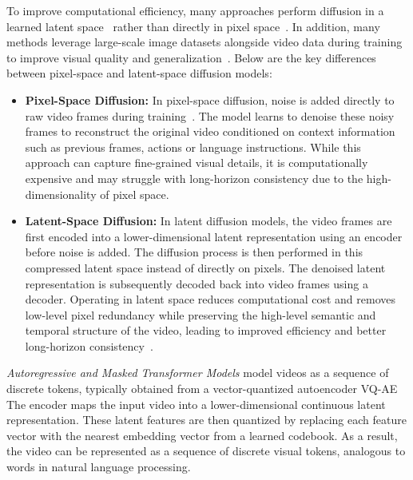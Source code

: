 To improve computational efficiency, many approaches perform diffusion in a learned latent space~\cite{videoworldsimulators2024, Blattmann2023StableVD, BarTal2024LumiereAS} rather than directly in pixel space~\cite{Singer2022MakeAVideoTG, Ho2022VideoDM, Ho2022ImagenVH}. In addition, many methods leverage large-scale image datasets alongside video data during training to improve visual quality and generalization~\cite{Ho2022VideoDM, Singer2022MakeAVideoTG, BarTal2024LumiereAS, Blattmann2023AlignYL, Ge2023PreserveYO, Dai2023EmuEI}. 
Below are the key differences between pixel-space and latent-space diffusion models:
\begin{itemize}
    \item \textbf{Pixel-Space Diffusion:} In pixel-space diffusion, noise is added directly to raw video frames during training~\cite{Ho2020DenoisingDP}. The model learns to denoise these noisy frames to reconstruct the original video conditioned on context information such as previous frames, actions or language instructions. While this approach can capture fine-grained visual details, it is computationally expensive and may struggle with long-horizon consistency due to the high-dimensionality of pixel space.

    \item \textbf{Latent-Space Diffusion:} In latent diffusion models, the video frames are first encoded into a lower-dimensional latent representation using an encoder before noise is added. The diffusion process is then performed in this compressed latent space instead of directly on pixels. The denoised latent representation is subsequently decoded back into video frames using a decoder. Operating in latent space reduces computational cost and removes low-level pixel redundancy while preserving the high-level semantic and temporal structure of the video, leading to improved efficiency and better long-horizon consistency~\cite{Yan2021VideoGPTVG}.
\end{itemize}


\textit{Autoregressive and Masked Transformer Models} model videos as a sequence of discrete tokens, typically obtained from a vector-quantized autoencoder \ac{VQ-AE}~\cite{Yan2021VideoGPTVG, Yu2023LanguageMB, Ge2022LongVG, Kondratyuk2023VideoPoetAL}
The encoder maps the input video into a lower-dimensional continuous latent representation. These latent features are then quantized by replacing each feature vector with the nearest embedding vector from a learned codebook. As a result, the video can be represented as a sequence of discrete visual tokens, analogous to words in natural language processing.

